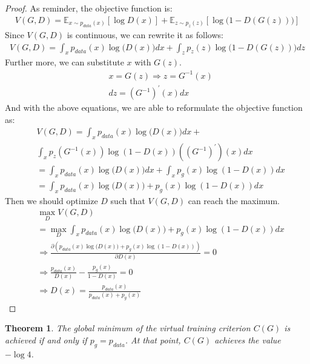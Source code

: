 \documentclass[10pt,twocolumn,letterpaper]{article}
\newtheorem{theorem}{Theorem}[section]
\begin{document}
\begin{proof}
As reminder, the objective function is: 
\begin{align*}
    V(G, D) = \mathbb{E}_{x \sim p_{data}(x)}[\log{D(x)}] + \mathbb{E}_{z \sim p_z(z)}[\log{\big(1 - D(G(z))\big)}]
\end{align*}
Since $V(G,D)$ is continuous, we can rewrite it as follows:
\begin{align*}
    V(G,D)=\int_xp_{data}(x)\log{\big(D(x)\big)}dx+\int_zp_z(z)\log{\big(1-D(G(z))\big)}dz
\end{align*}
Further more, we can substitute $x$ with $G(z)$.
\begin{align}
    &x = G(z) \Longrightarrow z = G^{-1}(x)\\
    & dz = (G^{-1})^{'}(x)dx
\end{align}
And with the above equations, we are able to reformulate the objective function as:
\begin{align*}
    &V(G,D)=\int_xp_{data}(x)\log{\big(D(x)\big)}dx+\\&\int_xp_z(G^{-1}(x))\log{(1-D(x))}((G^{-1})^{'})(x)dx \\
    &=\int_xp_{data}(x)\log{\big(D(x)\big)}dx+\int_xp_g(x)\log{(1-D(x))}dx\\
    &= \int_xp_{data}(x)\log{\big(D(x)\big)}+p_g(x)\log{(1-D(x))}dx
\end{align*}
Then we should optimize $D$ such that $V(G,D)$ can reach the maximum.
\begin{align*}
    &\max_DV(G,D)\\ &= \max_D\int_xp_{data}(x)\log{\big(D(x)\big)}+p_g(x)\log{(1-D(x))}dx\\
    &\Longrightarrow\frac{\partial{(p_{data}(x)\log{\big(D(x)\big)}+p_g(x)\log{(1-D(x))})}}{\partial{D(x)}} = 0\\
    &\Longrightarrow \frac{p_{data}(x)}{D(x)} - \frac{p_g(x)}{1-D(x)} = 0\\
    &\Longrightarrow D(x) = \frac{p_{data}(x)}{p_{data}(x)+p_g(x)}
\end{align*}
\end{proof}

\begin{theorem}
The global minimum of the virtual training criterion $C(G)$ is achieved if and only if $p_g = p_{data}$. At that point, $C(G)$ achieves the value $-\log{4}$.\cite{goodfellow2014generative}
\end{theorem}
\end{document}
